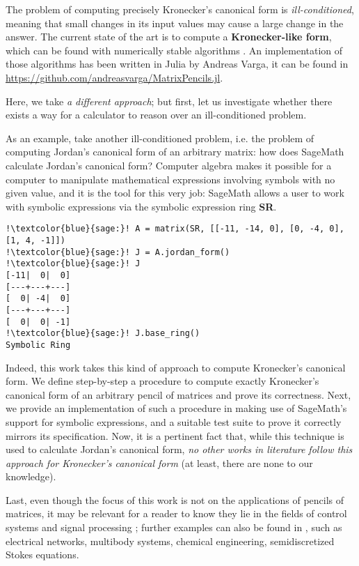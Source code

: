 The problem of computing precisely Kronecker's canonical form is \textit{ill-conditioned}, meaning
that small changes in its input values may cause a large change in the answer. The current state of the art is to
compute a \textbf{Kronecker-like form}, which can be found with numerically stable algorithms
\cite{beelen-van_dooren}. An implementation of those
algorithms has been written in Julia \cite{bezanson2017julia} by Andreas Varga, it can be found in
\url{https://github.com/andreasvarga/MatrixPencils.jl}.

Here, we take \textit{a different approach}; but first, let us investigate whether there exists a way for a
calculator to reason over an ill-conditioned problem.

As an example, take another ill-conditioned problem, i.e. the problem of computing Jordan's canonical form of
an arbitrary matrix: how does SageMath calculate Jordan's canonical form? Computer algebra makes it possible for
a computer to manipulate mathematical expressions involving symbols with no given value, and it is the tool for
this very job: SageMath allows a user to work with symbolic expressions via the symbolic expression ring \textbf{SR}.
\begin{verbatim}
!\textcolor{blue}{sage:}! A = matrix(SR, [[-11, -14, 0], [0, -4, 0], [1, 4, -1]])
!\textcolor{blue}{sage:}! J = A.jordan_form()
!\textcolor{blue}{sage:}! J
[-11|  0|  0]
[---+---+---]
[  0| -4|  0]
[---+---+---]
[  0|  0| -1]
!\textcolor{blue}{sage:}! J.base_ring()
Symbolic Ring
\end{verbatim}

Indeed, this work takes this kind of approach to compute Kronecker's canonical form. We define step-by-step a
procedure to compute exactly Kronecker's canonical form of an arbitrary pencil of matrices and prove its
correctness. Next, we provide an implementation of such a procedure in \cite{trapani-kronecker} making use of
SageMath's support for symbolic expressions, and a suitable test suite to prove it correctly mirrors its
specification. Now, it is a pertinent fact that, while this technique is used to calculate Jordan's canonical
form, \textit{no other works in literature follow this approach for Kronecker's canonical form} (at least, there
are none to our knowledge).

Last, even though the focus of this work is not on the applications of pencils of matrices, it may be relevant
for a reader to know they lie in the fields of control
systems \cite{824690, 1103983} and signal processing \cite{1179782}; further examples can also be found in
\cite[pp. 8-11]{kunkel-mehrmann}, such as electrical networks, multibody systems, chemical
engineering, semidiscretized Stokes equations.

